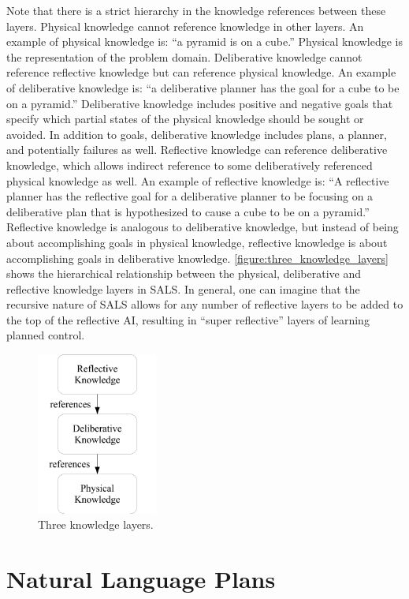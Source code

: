 Note that there is a strict hierarchy in the knowledge references
between these layers.  Physical knowledge cannot reference knowledge
in other layers.  An example of physical knowledge is: ``a pyramid is
on a cube.''  Physical knowledge is the representation of the problem
domain.  Deliberative knowledge cannot reference reflective knowledge
but can reference physical knowledge.  An example of deliberative
knowledge is: ``a deliberative planner has the goal for a cube to be
on a pyramid.''  Deliberative knowledge includes positive and negative
goals that specify which partial states of the physical knowledge
should be sought or avoided.  In addition to goals, deliberative
knowledge includes plans, a planner, and potentially failures as well.
Reflective knowledge can reference deliberative knowledge, which
allows indirect reference to some deliberatively referenced physical
knowledge as well.  An example of reflective knowledge is: ``A
reflective planner has the reflective goal for a deliberative planner
to be focusing on a deliberative plan that is hypothesized to cause a
cube to be on a pyramid.''  Reflective knowledge is analogous to
deliberative knowledge, but instead of being about accomplishing goals
in physical knowledge, reflective knowledge is about accomplishing
goals in deliberative knowledge.
{\autoref{figure:three_knowledge_layers}} shows the hierarchical
relationship between the physical, deliberative and reflective
knowledge layers in SALS.  In general, one can imagine that the
recursive nature of SALS allows for any number of reflective layers to
be added to the top of the reflective AI, resulting in ``super
reflective'' layers of learning planned control.
\begin{figure}
  \center
  \includegraphics[width=4cm]{gfx/three_knowledge_layers}
  \caption{Three knowledge layers.}
  \label{figure:three_knowledge_layers}
\end{figure}

\section{Natural Language Plans}

